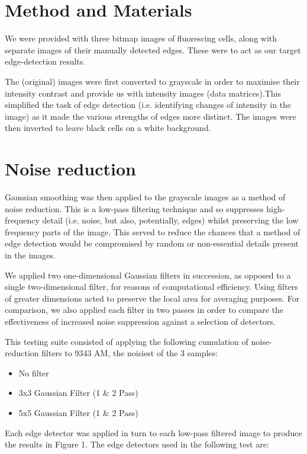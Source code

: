 \documentclass[a4paper]{article}
\begin{document}
\begin{multicols*}{2}
\section*{Method and Materials}

We were provided with three bitmap images of fluorescing cells, along with separate images of their manually detected edges. These were to act as our target edge-detection results.

The (original) images were first converted to grayscale in order to maximise their intensity contrast and provide us with intensity images (data matrices).This simplified the task of edge detection (i.e. identifying changes of intensity in the image) as it made the various strengths of edges more distinct. The images were then inverted to leave black cells on a white background. 

\section*{Noise reduction}

Gaussian smoothing was then applied to the grayscale images as a method of noise reduction. This is a low-pass filtering technique and so suppresses high-frequency detail (i.e. noise, but also, potentially, edges) whilst preserving the low frequency parts of the image. This served to reduce the chances that a method of edge detection would be compromised by random or non-essential details present in the images.

We applied two one-dimensional Gaussian filters in succession, as opposed to a single two-dimensional filter, for reasons of computational efficiency. Using filters of greater dimensions acted to preserve the local area for averaging purposes. For comparison, we also applied each filter in two passes in order to compare the effectiveness of increased noise suppression against a selection of detectors.

This testing suite consisted of applying the following cumulation of noise-reduction filters to 9343 AM, the noisiest of the 3 samples:

\begin{itemize}[noitemsep]
    \item No filter
    \item 3x3 Gaussian Filter (1 \& 2 Pass)
    \item 5x5 Gaussian Filter (1 \& 2 Pass)
\end{itemize}

Each edge detector was applied in turn to each low-pass filtered image to produce the results in Figure 1.
The edge detectors used in the following test are:


\end{multicols*}
\end{document}

